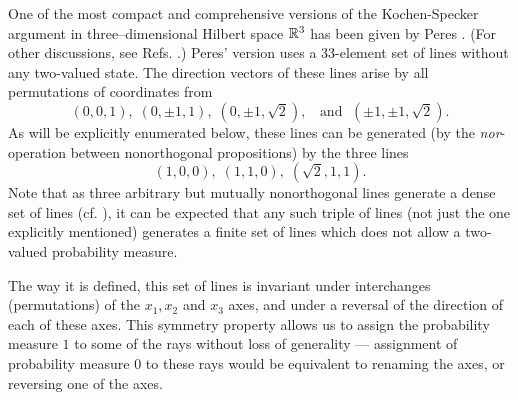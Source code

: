 \documentclass[%
  preprint,
 showpacs,
 showkeys,
 preprintnumbers,
 amsmath,amssymb,
 aps,
 rmp,
  longbibliography,
 ]{revtex4-1}
\begin{document}
One of the most compact and comprehensive versions of the Kochen-Specker
argument in three--dimensional Hilbert space ${\Bbb R}^3$ has been given
by Peres
\cite{peres-91}.
(For other discussions, see Refs.
\cite{stairs83,redhead,jammer-92,brown,peres-91,peres,penrose-ks,clifton-93,mermin-93,svozil-tkadlec}.)
Peres' version uses
a 33-element
set of lines without any two-valued state.
The direction vectors of these lines
arise by all permutations of coordinates from
\begin{equation}
(0,0,1),\;
(0,\pm 1,1),\;
(0,\pm 1,\sqrt{2}),\;
\;\textrm{ and }\; (\pm 1,\pm 1,\sqrt{2}).
\label{p-ksl}
\end{equation}
As will be explicitly enumerated below, these lines can be generated (by
the {\it nor}-operation between nonorthogonal propositions)
by the three lines
\cite{svozil-tkadlec}
$$(1,0,0),\; (1,1,0),\; (\sqrt2,1,1).$$
Note that as three arbitrary but mutually nonorthogonal lines generate
a dense set of lines
(cf. \cite{havlicek}),
it can be expected that any such triple of lines (not just the one
explicitly mentioned) generates a finite set of lines which does not
allow a two-valued probability measure.


The way it is defined, this set of lines is invariant under interchanges
(permutations) of the $x_1,x_2$ and $x_3$ axes, and under a reversal of
the direction of each of these axes.
This symmetry property allows us to assign the probability measure $1$
to some of the rays without loss of generality --- assignment of
probability measure $0$ to these rays would be equivalent to renaming
the axes, or reversing one of the axes.
\end{document}

